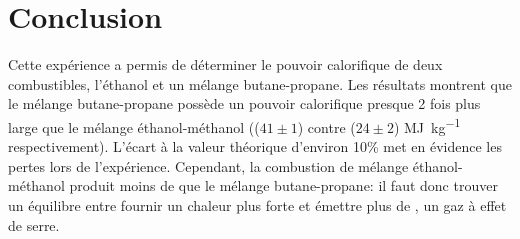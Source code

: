 \section{Conclusion}

Cette expérience a permis de déterminer le pouvoir calorifique de deux combustibles, l'éthanol et un mélange butane-propane. Les résultats montrent que le mélange butane-propane possède un pouvoir calorifique presque 2 fois plus large que le mélange éthanol-méthanol ((\(41 \pm 1\)) contre (\(24 \pm 2\)) \si{\mega\joule\per\kilo\gram} respectivement). L'écart à la valeur théorique d'environ 10\% met en évidence les pertes lors de l'expérience. Cependant, la combustion de mélange éthanol-méthanol produit moins de  que le mélange butane-propane: il faut donc trouver un équilibre entre fournir un chaleur plus forte et émettre plus de , un gaz à effet de serre.